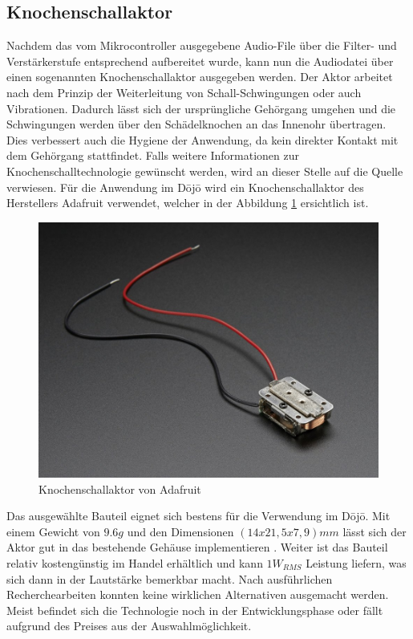 \subsection{Knochenschallaktor} \label{sec:knochenschallaktor}
Nachdem das vom Mikrocontroller ausgegebene Audio-File über die Filter- und Verstärkerstufe entsprechend aufbereitet wurde, kann nun die Audiodatei über einen sogenannten Knochenschallaktor ausgegeben werden. Der Aktor arbeitet nach dem Prinzip der Weiterleitung von Schall-Schwingungen oder auch Vibrationen. Dadurch lässt sich der ursprüngliche Gehörgang umgehen und die Schwingungen werden über den Schädelknochen an das Innenohr übertragen. Dies verbessert auch die Hygiene der Anwendung, da kein direkter Kontakt mit dem Gehörgang stattfindet\cite{Knochenschall}. Falls weitere Informationen zur Knochenschalltechnologie gewünscht werden, wird an dieser Stelle auf die Quelle \cite{Knochenschall_HDM_Stuttgart} verwiesen. Für die Anwendung im Dōjō wird ein Knochenschallaktor des Herstellers Adafruit verwendet, welcher in der Abbildung \ref{fig:knochenschallAda} ersichtlich ist.

\begin{figure}[H]
	\begin{center}
		\includegraphics[width=120mm]{data/KnochenschallaktorAdafruit1.jpg}
		\caption[Knochenschallaktor \cite{BoneConductorAdafruit}]{Knochenschallaktor von Adafruit} %
		\label{fig:knochenschallAda}
	\end{center}
\end{figure}

Das ausgewählte Bauteil eignet sich bestens für die Verwendung im Dōjō. Mit einem Gewicht von $9.6 g$ und den Dimensionen $(14x21,5x7,9) mm$ lässt sich der Aktor gut in das bestehende Gehäuse implementieren \cite{BoneConductorAdafruit}. Weiter ist das Bauteil relativ kostengünstig im Handel erhältlich und kann $1W_{RMS}$ Leistung liefern, was sich dann in der Lautstärke bemerkbar macht. Nach ausführlichen Recherchearbeiten konnten keine wirklichen Alternativen ausgemacht werden. Meist befindet sich die Technologie noch in der Entwicklungsphase oder fällt aufgrund des Preises aus der Auswahlmöglichkeit.
